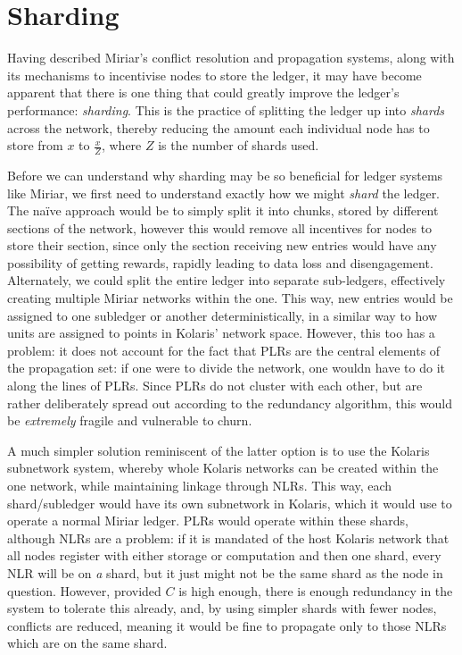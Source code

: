 \documentclass{extreport}
\begin{document}
\chapter{Sharding}
\label{sec:orga7ad456}

Having described Miriar's conflict resolution and propagation systems, along with its mechanisms to incentivise nodes to store the ledger, it may have become apparent that there is one thing that could greatly improve the ledger's performance: \emph{sharding}. This is the practice of splitting the ledger up into \emph{shards} across the network, thereby reducing the amount each individual node has to store from \(x\) to \(\frac{x}{Z}\), where \(Z\) is the number of shards used.

Before we can understand why sharding may be so beneficial for ledger systems like Miriar, we first need to understand exactly how we might \emph{shard} the ledger. The naïve approach would be to simply split it into chunks, stored by different sections of the network, however this would remove all incentives for nodes to store their section, since only the section receiving new entries would have any possibility of getting rewards, rapidly leading to data loss and disengagement. Alternately, we could split the entire ledger into separate sub-ledgers, effectively creating multiple Miriar networks within the one. This way, new entries would be assigned to one subledger or another deterministically, in a similar way to how units are assigned to points in Kolaris' network space. However, this too has a problem: it does not account for the fact that PLRs are the central elements of the propagation set: if one were to divide the network, one wouldn have to do it along the lines of PLRs. Since PLRs do not cluster with each other, but are rather deliberately spread out according to the redundancy algorithm, this would be \emph{extremely} fragile and vulnerable to churn.

A much simpler solution reminiscent of the latter option is to use the Kolaris subnetwork system, whereby whole Kolaris networks can be created within the one network, while maintaining linkage through NLRs. This way, each shard/subledger would have its own subnetwork in Kolaris, which it would use to operate a normal Miriar ledger. PLRs would operate within these shards, although NLRs are a problem: if it is mandated of the host Kolaris network that all nodes register with either storage or computation and then one shard, every NLR will be on \emph{a} shard, but it just might not be the same shard as the node in question. However, provided \(C\) is high enough, there is enough redundancy in the system to tolerate this already, and, by using simpler shards with fewer nodes, conflicts are reduced, meaning it would be fine to propagate only to those NLRs which are on the same shard.
\end{document}
